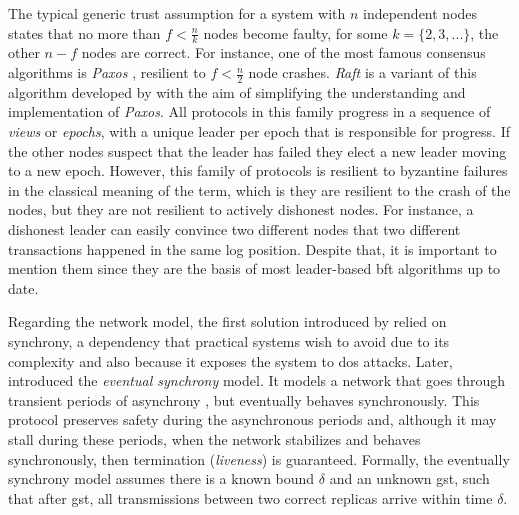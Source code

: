 \vspace{3mm}
The typical generic trust assumption for a system with $n$ independent nodes states that no more than $f < \displaystyle \frac{n}{k}$ nodes become faulty, for some $k = \{2, 3, ...\}$, the other $n - f$ nodes are correct. For instance, one of the most famous consensus algorithms is \textit{Paxos} \citep{Lamport:1998:PP:279227.279229,lamport2001paxos} , resilient to $ f < \displaystyle \frac{n}{2}$ node crashes. \textit{Raft} is a variant of this algorithm developed by \cite{Ongaro:2014:SUC:2643634.2643666} with the aim of simplifying the understanding and implementation of \textit{Paxos}. All protocols in this family progress in a sequence of \textit{views} or \textit{epochs}, with a unique leader per epoch that is responsible for progress. If the other nodes suspect that the leader has failed they elect a new leader moving to a new epoch. However, this family of protocols is resilient to byzantine failures in the classical meaning of the term, which is they are resilient to the crash of the nodes, but they are not resilient to actively dishonest nodes. For instance, a dishonest leader can easily convince two different nodes that two different transactions happened in the same log position. Despite that, it is important to mention them since they are the basis of most leader-based \gls{bft} algorithms up to date. 

\vspace{3mm}
Regarding the network model, the first solution introduced by \cite{Pease:1980:RAP:322186.322188} relied on synchrony, a dependency that practical systems wish to avoid due to its complexity and also because it exposes the system to \gls{dos} attacks.
Later, \cite{Dwork:1988:CPP:42282.42283} introduced the \textit{eventual synchrony} model. It models a network that goes through transient periods of asynchrony , but eventually behaves synchronously. This protocol preserves safety during the asynchronous periods and, although it may stall during these periods, when the network stabilizes and behaves synchronously, then termination (\textit{liveness}) is guaranteed.
Formally, the eventually synchrony model assumes there is a known bound $\delta$ and an unknown \gls{gst}, such that after \gls{gst}, all transmissions between two correct replicas arrive within time $\delta$.

